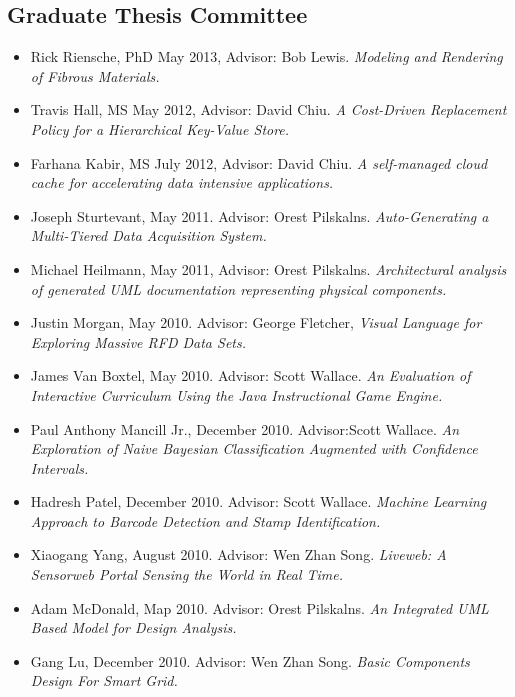 \documentclass[10pt]{article}
\begin{document}
\subsection*{Graduate Thesis Committee}
  \begin{itemize}
  \item Rick Riensche, PhD May 2013, Advisor: Bob Lewis. {\em Modeling and Rendering of
      Fibrous Materials.}
  \item Travis Hall, MS May 2012, Advisor: David Chiu. {\em A Cost-Driven 
      Replacement Policy for a Hierarchical Key-Value Store.}
  \item Farhana Kabir, MS July 2012, Advisor: David Chiu. {\em A self-managed cloud cache 
      for accelerating data intensive applications.}
  \item Joseph Sturtevant, May 2011. Advisor: Orest Pilskalns. {\em Auto-Generating 
      a Multi-Tiered Data Acquisition System.}
  \item Michael Heilmann, May 2011, Advisor: Orest Pilskalns. {\em Architectural analysis of 
      generated UML documentation representing physical components.}
  \item Justin Morgan, May 2010. Advisor: George Fletcher, {\em Visual Language for 
      Exploring Massive RFD Data Sets.}
  \item James Van Boxtel, May 2010. Advisor: Scott Wallace. {\em An Evaluation of 
      Interactive Curriculum Using the Java Instructional Game Engine.}
  \item Paul Anthony Mancill Jr., December 2010. Advisor:Scott Wallace. {\em An Exploration 
     of Naive Bayesian Classification Augmented with Confidence Intervals.}
  \item Hadresh Patel, December 2010. Advisor: Scott Wallace. {\em Machine Learning Approach 
      to Barcode Detection and Stamp Identification.} 
  \item Xiaogang Yang, August 2010. Advisor: Wen Zhan Song. {\em Liveweb: A Sensorweb Portal 
      Sensing the World in Real Time.}
  \item Adam McDonald, Map 2010. Advisor: Orest Pilskalns. {\em An Integrated UML Based 
      Model for Design Analysis.}
  \item Gang Lu, December 2010. Advisor: Wen Zhan Song. {\em Basic Components Design For Smart Grid.}

\end{itemize}
\end{document}
